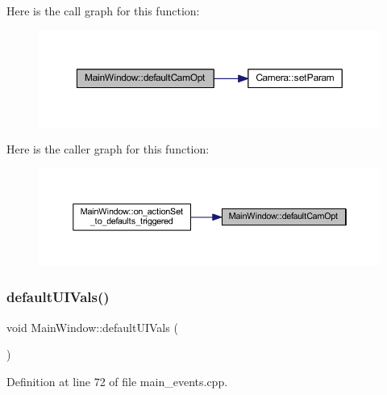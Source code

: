 Here is the call graph for this function\+:
\nopagebreak
\begin{figure}[H]
\begin{center}
\leavevmode
\includegraphics[width=350pt]{class_main_window_ad6c3df0bfe7f2357d3f2083e20e3810a_cgraph}
\end{center}
\end{figure}
Here is the caller graph for this function\+:
\nopagebreak
\begin{figure}[H]
\begin{center}
\leavevmode
\includegraphics[width=350pt]{class_main_window_ad6c3df0bfe7f2357d3f2083e20e3810a_icgraph}
\end{center}
\end{figure}
\mbox{\label{class_main_window_a6021f4624cf5aa8ced6b210d388ac31d}} 
\subsubsection{\texorpdfstring{defaultUIVals()}{defaultUIVals()}}
{\footnotesize\ttfamily void Main\+Window\+::default\+U\+I\+Vals (\begin{DoxyParamCaption}{ }\end{DoxyParamCaption})\hspace{0.3cm}{\ttfamily [private]}}



Definition at line 72 of file main\+\_\+events.\+cpp.

